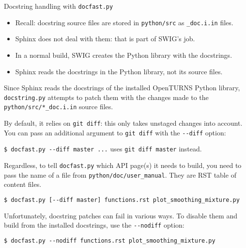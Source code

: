 \documentclass[8pt]{beamer}
\begin{document}
\begin{frame}{Docstring handling with \texttt{docfast.py}}
\begin{itemize}
    \item Recall: docstring source files are stored in
    \texttt{python/\alert{src}} as \texttt{\_doc.i.in} files.
    \item \alert{Sphinx} does not deal with them: that is part of \alert{SWIG}'s job.
    \item In a normal build, SWIG creates the Python library \alert{with the docstrings}.
    \item Sphinx reads the docstrings in the Python library, \alert{not its source files}.
\end{itemize}

Since Sphinx reads the docstrings of the installed OpenTURNS Python library, \texttt{docstring.py}
attempts to \alert{patch} them with the changes made to the \texttt{python/src/*\_doc.i.in} source files.

By default, it relies on \alert{\texttt{git diff}}: this only takes unstaged changes into account. \newline
You can pass an additional argument to \texttt{git diff} with the \alert{\texttt{-{}-diff}} option:

\texttt{\$ docfast.py -{}-diff master ...} uses \texttt{git diff master} instead.

Regardless, to tell \texttt{docfast.py} which API page(s) it needs to build, you need to pass the name of a file from \texttt{python/\alert{doc}/user\_manual}. They are RST table of content files.

\texttt{\$ docfast.py [-{}-diff master] functions.rst plot\_smoothing\_mixture.py}

Unfortunately, docstring patches can fail in various ways. \newline
To disable them and build from the installed docstrings, use the \alert{\texttt{-{}-nodiff}} option:

\texttt{\$ docfast.py -{}-nodiff functions.rst plot\_smoothing\_mixture.py}
\end{frame}
\end{document}
